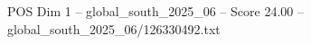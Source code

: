 \begin{textsample}{POS Dim 1 – global\_south\_2025\_06 – Score 24.00 – global\_south\_2025\_06/126330492.txt}
\end{textsample}
